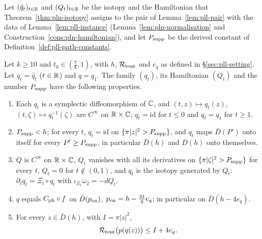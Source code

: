 Let $(\hat q_t)_{t\in\mathbb{R}}$ and $(Q_t)_{t\in\mathbb{R}}$ be the isotopy and the Hamiltonian that Theorem~\ref{thm:pln-isotopy}
assigns to the pair of Lemma~\ref{lem:pll-pair} with the data of Lemma~\ref{lem:pll-instance}
(Lemma~\ref{lem:pln-normalisation} and Construction~\ref{cons:pln-hamiltonian}), and let $P_{\rm supp}$ be the derived
constant of Definition~\ref{def:pll-path-constants}.

\begin{theorem}\label{thm:pll-inner}
Let $k\ge10$ and $t_0\in(\frac78,1)$, with $h$, $\mathcal{R}_{\rm tent}$ and $e_q$ as defined in \S\ref{sec:pll-setting}. Let
$q_t=\hat q_t$ ($t\in\mathbb{R}$) and $q=q_1$. The family $(q_t)$, its Hamiltonian $(Q_t)$ and the number $P_{\rm supp}$ have
the following properties.
\begin{enumerate}[label=(\alph*)]
\item Each $q_t$ is a symplectic diffeomorphism of $\mathbb{C}$, and $(t,z)\mapsto q_t(z)$, $(t,\zeta)\mapsto q_t^{-1}(\zeta)$
 are $C^\infty$ on $\mathbb{R}\times\mathbb{C}$; $q_t=\mathrm{id}$ for $t\le0$ and $q_t=q_1$ for $t\ge1$.
\item $P_{\rm supp}<h$; for every $t$, $q_t=\mathrm{id}$ on $\{\pi|z|^2>P_{\rm supp}\}$, and $q_t$ maps $\bar D(P')$ onto
 itself for every $P'\ge P_{\rm supp}$, in particular $\bar D(h)$ and $D(h)$ onto themselves.
\item $Q$ is $C^\infty$ on $\mathbb{R}\times\mathbb{C}$, $Q_t$ vanishes with all its derivatives on $\{\pi|\zeta|^2>P_{\rm supp}\}$ for
 every $t$, $Q_t=0$ for $t\notin(0,1)$, and $q_t$ is the isotopy generated by $Q_t$: $\partial_tq_t=\Xi_t\circ q_t$
 with $\iota_{\Xi_t}\omega_2=-dQ_t$.
\item $q$ equals $C_{\rm ph}\circ f$ on $\bar D(p_{\rm on})$, $p_{\rm on}=h-\frac{31}8e_q$; in particular on
 $\bar D(h-4e_q)$.
\item For every $z\in\bar D(h)$, with $I=\pi|z|^2$,
 \begin{equation}\label{eq:pll-full-comparison}
  \mathcal{R}_{\rm tent}\bigl(p(q(z))\bigr)\le I+4e_q .
 \end{equation}
\end{enumerate}
\end{theorem}

